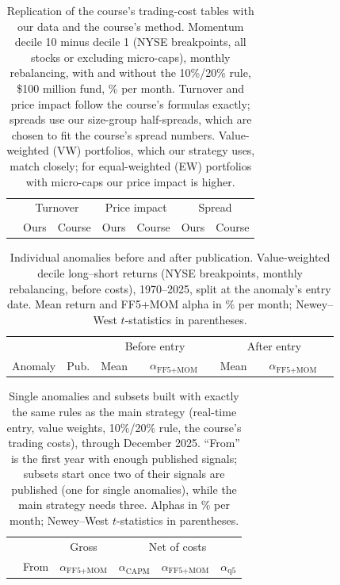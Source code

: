 \documentclass[12pt,a4paper]{article}
\begin{document}
\begin{singlespace}
\begin{table}[!htbp]\centering
\caption{Replication of the course's trading-cost tables with our data and the course's method. Momentum decile 10 minus decile 1 (NYSE breakpoints, all stocks or excluding micro-caps), monthly rebalancing, with and without the 10\%/20\% rule, \$100 million fund, \% per month. Turnover and price impact follow the course's formulas exactly; spreads use our size-group half-spreads, which are chosen to fit the course's spread numbers. Value-weighted (VW) portfolios, which our strategy uses, match closely; for equal-weighted (EW) portfolios with micro-caps our price impact is higher.}\label{tab:replication}
\footnotesize
\begin{tabular}{lrrrrrr}\toprule
 & \multicolumn{2}{c}{Turnover} & \multicolumn{2}{c}{Price impact} & \multicolumn{2}{c}{Spread}\\
 & Ours & Course & Ours & Course & Ours & Course\\\midrule

\bottomrule\end{tabular}
\end{table}

\begin{table}[!htbp]\centering
\caption{Individual anomalies before and after publication. Value-weighted decile long--short returns (NYSE breakpoints, monthly rebalancing, before costs), 1970--2025, split at the anomaly's entry date. Mean return and FF5+MOM alpha in \% per month; Newey--West $t$-statistics in parentheses.}\label{tab:single}
\footnotesize
\setlength{\tabcolsep}{2.5pt}\begin{tabular}{lcrrrr|rrrr}\toprule
 & & \multicolumn{4}{c|}{Before entry} & \multicolumn{4}{c}{After entry}\\
Anomaly & Pub. & Mean & & $\alpha_{\text{FF5+MOM}}$ & & Mean & & $\alpha_{\text{FF5+MOM}}$ & \\\midrule

\bottomrule\end{tabular}
\end{table}

\begin{table}[!htbp]\centering
\caption{Single anomalies and subsets built with exactly the same rules as the main strategy (real-time entry, value weights, 10\%/20\% rule, the course's trading costs), through December 2025. ``From'' is the first year with enough published signals; subsets start once two of their signals are published (one for single anomalies), while the main strategy needs three. Alphas in \% per month; Newey--West $t$-statistics in parentheses.}\label{tab:alternatives}
\footnotesize
\setlength{\tabcolsep}{2pt}\begin{tabular}{lcrrrrrrrr}\toprule
 & & \multicolumn{2}{c}{Gross} & \multicolumn{6}{c}{Net of costs}\\
 & From & \multicolumn{2}{c}{$\alpha_{\text{FF5+MOM}}$} & \multicolumn{2}{c}{$\alpha_{\text{CAPM}}$} & \multicolumn{2}{c}{$\alpha_{\text{FF5+MOM}}$} & \multicolumn{2}{c}{$\alpha_{\text{q5}}$}\\\midrule

\bottomrule\end{tabular}
\end{table}


\end{singlespace}
\end{document}
